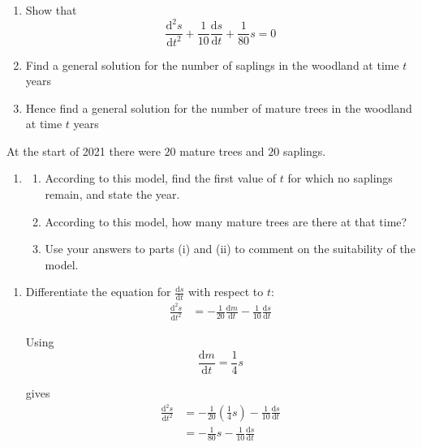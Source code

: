 \documentclass[leqno]{article}
\begin{document}
\begin{enumerate}[
  label=\textbf{\arabic*.},
  leftmargin=*,
  topsep=0pt,
  partopsep=0pt,
  parsep=0pt
]
\begin{enumerate}[label=\textbf{(\alph*)}]
  \item Show that
  \[\frac{\mathrm{d}^2 s}{\mathrm{d}t^2}+\frac{1}{10}\frac{\mathrm{d}s}{\mathrm{d}t}+\frac{1}{80}s=0\]
  \item Find a general solution for the number of saplings in the woodland at time $t$ years  \\
  \item Hence find a general solution for the number of mature trees in the woodland at time $t$ years  \\
\end{enumerate}
At the start of 2021 there were $20$ mature trees and $20$ saplings. \\
\begin{enumerate}[label=\textbf{(\alph*)}, resume]
  \item \begin{enumerate}[label=(\roman*)]
    \item According to this model, find the first value of $t$ for which no saplings remain, and state the year.
    \item According to this model, how many mature trees are there at that time?
    \item Use your answers to parts (i) and (ii) to comment on the suitability of the model.
  \end{enumerate}
\end{enumerate}

\vspace*{10pt}

\begin{djsSolution}
\begin{enumerate}[label=\textbf{(\alph*)}]
  \item Differentiate the equation for $\frac{\mathrm{d}s}{\mathrm{d}t}$ with respect to $t$:
  \begin{align*}
  \frac{\mathrm{d}^2s}{\mathrm{d}t^2}
  &= -\frac{1}{20}\frac{\mathrm{d}m}{\mathrm{d}t}-\frac{1}{10}\frac{\mathrm{d}s}{\mathrm{d}t}
  \end{align*}

  Using
  \[
  \frac{\mathrm{d}m}{\mathrm{d}t}=\frac14 s
  \]

  gives
  \begin{align*}
  \frac{\mathrm{d}^2s}{\mathrm{d}t^2}
  &= -\frac{1}{20}\left(\frac14 s\right)-\frac{1}{10}\frac{\mathrm{d}s}{\mathrm{d}t} \\
  &= -\frac{1}{80}s-\frac{1}{10}\frac{\mathrm{d}s}{\mathrm{d}t}
  \end{align*}


\end{enumerate}
\end{djsSolution}
\end{enumerate}
\end{document}
